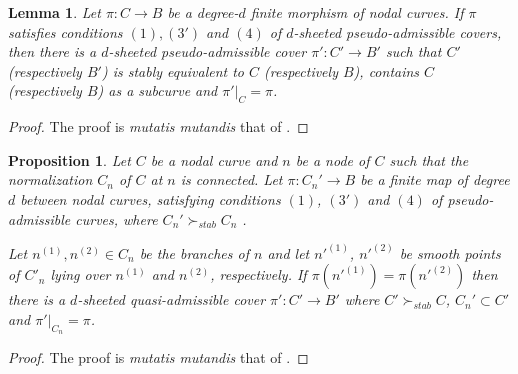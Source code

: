 \documentclass{article}
\newtheorem{lemma}[theorem]{Lemma}
\newtheorem{proposition}[theorem]{Proposition}
\newcommand{\steq}{\succ_{stab}}
\renewcommand{\:}{\colon }
\begin{document}
\begin{lemma}\label{lem:condition2}%
    Let $\pi: C \rightarrow B$ be a degree-$d$ finite morphism of nodal curves. If $\pi$ satisfies conditions $(1), ({3}')$ and $(4)$ of $d$-sheeted pseudo-admissible covers, then there is a $d$-sheeted pseudo-admissible cover ${\pi}':{C}'\rightarrow {B}' $ such that ${C}'$ (respectively ${B}'$) is stably equivalent to $C$ (respectively $B$), contains $C$ (respectively $B$) as a subcurve and ${\pi}'|_{C}=\pi$.
\end{lemma}
\begin{proof}
The proof is {\it mutatis mutandis} that of \cite[Theorem 3.3 (a)]{paper1}. 
%
%
%
\end{proof}

\begin{proposition}\label{prop:teo3.4b}
Let $C$ be a nodal curve and $n$ be a node of $C$ such that the 
normalization $C_n$ of $C$ at $n$ is connected.
Let $\pi\:C_n'\rightarrow B$ be a finite map of degree $d$ between nodal curves, satisfying conditions 
$(1)$, $(3')$ and $(4)$ of pseudo-admissible curves, where $C_n'\steq C_n$ .

Let $n^{(1)}, n^{(2)} \in C_n$ be the branches of $n$ and  let ${n}'^{(1)}$, ${n}'^{(2)}$ be smooth points of ${C}'_n$ lying over $n^{(1)}$ and $ n^{(2)}$, respectively.
If $\pi(n'^{(1)})=\pi(n'^{(2)})$ then there is a $d$-sheeted quasi-admissible cover $\pi'\:C'\rightarrow B'$ where $C'\steq C$, $C_n'\subset C'$ and $\pi'|_{C_n}=\pi$.
\end{proposition}
\begin{proof}
The proof is {\it mutatis mutandis} that of \cite[Theorem 3.4 (b)]{paper1}. 
\end{proof}
\end{document}
